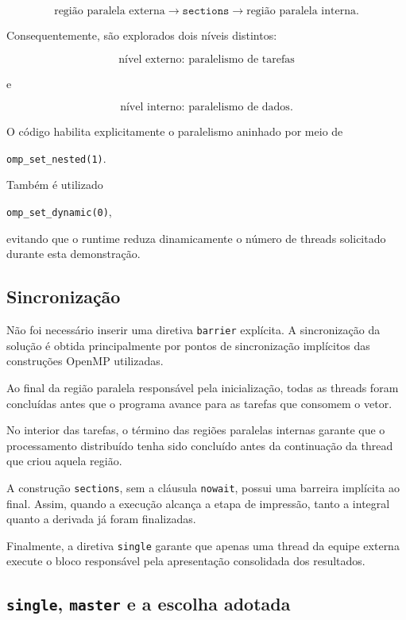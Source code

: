 \[
\text{região paralela externa}
\rightarrow
\texttt{sections}
\rightarrow
\text{região paralela interna}.
\]

Consequentemente, são explorados dois níveis distintos:

\[
\boxed{\text{nível externo: paralelismo de tarefas}}
\]

e

\[
\boxed{\text{nível interno: paralelismo de dados}}.
\]

O código habilita explicitamente o paralelismo aninhado por meio de

\begin{center}
\texttt{omp\_set\_nested(1)}.
\end{center}

Também é utilizado

\begin{center}
\texttt{omp\_set\_dynamic(0)},
\end{center}

evitando que o runtime reduza dinamicamente o número de threads solicitado
durante esta demonstração.


\subsection{Sincronização}

Não foi necessário inserir uma diretiva \texttt{barrier} explícita. A
sincronização da solução é obtida principalmente por pontos de sincronização
implícitos das construções OpenMP utilizadas.

Ao final da região paralela responsável pela inicialização, todas as threads
foram concluídas antes que o programa avance para as tarefas que consomem o
vetor.

No interior das tarefas, o término das regiões paralelas internas garante que
o processamento distribuído tenha sido concluído antes da continuação da
thread que criou aquela região.

A construção \texttt{sections}, sem a cláusula \texttt{nowait}, possui uma
barreira implícita ao final. Assim, quando a execução alcança a etapa de
impressão, tanto a integral quanto a derivada já foram finalizadas.

Finalmente, a diretiva \texttt{single} garante que apenas uma thread da equipe
externa execute o bloco responsável pela apresentação consolidada dos
resultados.


\subsection{\texttt{single}, \texttt{master} e a escolha adotada}

